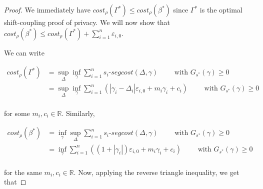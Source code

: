 \documentclass{article}
\newcommand{\R}{\mathbb{R}}
\renewcommand{\epsilon}{\varepsilon}
\newcommand{\1}{\langle 1 \rangle}
\newcommand{\2}{\langle 2 \rangle}
\begin{document}
\begin{proof}
    We immediately have $cost_\rho(\Gamma^*) \leq cost_\rho(\beta^*)$ since $\Gamma^*$ is the optimal shift-coupling proof of privacy. We will now show that $cost_\rho(\beta^*) \leq cost_\rho(\Gamma^*) + \sum_{i = 1}^n \epsilon_{i, 0}$.

    We can write 

    \begin{align*}
        cost_\rho(\Gamma^*) &= \sup_{\Delta} \inf_{\gamma} \sum_{i = 1}^n s_i\text{-}segcost(\Delta, \gamma) \qquad \text{ with } G_{s^*}(\gamma) \geq 0\\
        &= \sup_{\Delta} \inf_{\gamma} \sum_{i = 1}^n \left(|\gamma_i - \Delta_i| \epsilon_{i, 0} + m_i \gamma_i + c_i\right) \qquad \text{ with } G_{s^*}(\gamma) \geq 0\\
    \end{align*}

    for some $m_i, c_i \in \R$. Similarly, 

    \begin{align*}
        cost_\rho(\beta^*) &= \inf_{\gamma} \sup_{\Delta} \sum_{i = 1}^n s_i\text{-}segcost(\Delta, \gamma) \qquad \text{ with } G_{s^*}(\gamma) \geq 0\\
        &= \inf_{\gamma} \sum_{i = 1}^n \left((1 + |\gamma_i|) \epsilon_{i, 0} + m_i \gamma_i + c_i\right) \qquad \text{ with } G_{s^*}(\gamma) \geq 0\\
    \end{align*}

    for the same $m_i, c_i \in \R$. Now, applying the reverse triangle inequality, we get that


\end{proof}
\end{document}

